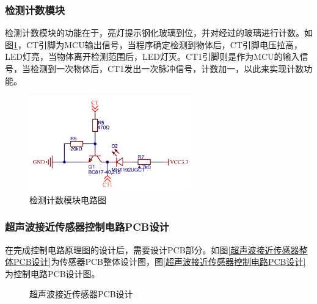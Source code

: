 \subsubsection{检测计数模块}
检测计数模块的功能在于，亮灯提示钢化玻璃到位，并对经过的玻璃进行计数。如图\ref{检测计数模块电路图}，CT引脚为MCU输出信号，当程序确定检测到物体后，CT引脚电压拉高，LED灯亮，当物体离开检测范围后，LED灯灭。CT1引脚则是作为MCU的输入信号，当检测到一次物体后，CT1发出一次脉冲信号，计数加一，以此来实现计数功能。
\begin{figure}[ht]
	\centering
	\includegraphics[width=7cm]{figure/detection count circuit.png}
	\caption{检测计数模块电路图}
	\label{检测计数模块电路图}
\end{figure}

\subsubsection{超声波接近传感器控制电路PCB设计}
在完成控制电路原理图的设计后，需要设计PCB部分。如图\ref{超声波接近传感器整体PCB设计}为传感器PCB整体设计图，图\ref{超声波接近传感器控制电路PCB设计}为控制电路PCB设计图。
\begin{figure}[ht]
	\centering
	\caption{超声波接近传感器PCB设计}
	\label{超声波接近传感器PCB设计}
\end{figure}

